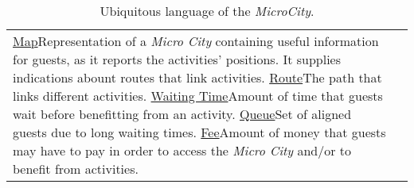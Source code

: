 \begin{table}[H]
\begin{tabular}{|l|p{}|}
        \ul{Map}{Representation of a \textit{Micro City} containing useful information for guests, as it reports the activities' positions. It supplies indications abount routes that link activities.}
        \ul{Route}{The path that links different activities.}
        \ul{Waiting Time}{Amount of time that guests wait before benefitting from an activity.}
        \ul{Queue}{Set of aligned guests due to long waiting times.}
        \ul{Fee}{Amount of money that guests may have to pay in order to access the \textit{Micro City} and/or to benefit from activities.}
    \end{tabular}
    \caption{Ubiquitous language of the \textit{MicroCity}.}
    \label{tab:ul}
\end{table}
